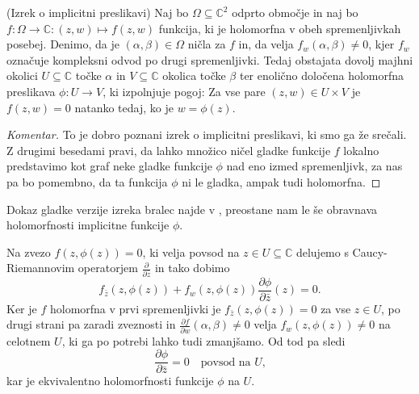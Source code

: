 \documentclass[mat1]{fmfdelo}
\newcommand{\C}{\mathbb C}
\newcommand{\pdv}[2][]{\frac{\partial#1}{\partial#2}}
\theoremstyle{definition}
\newenvironment{komentar}[1][Komentar]{\begin{proof}[#1]\let\qed\relax}{\end{proof}}
\begin{document}
\begin{izrek}(Izrek o implicitni preslikavi)
    \label{izrek o impliclitni preslikavi}
    Naj bo $\Omega \subseteq \C^2$ odprto območje in naj bo $f : \Omega \to \C : (z, w) \mapsto f(z,w)$ funkcija, ki je holomorfna v obeh spremenljivkah posebej. Denimo, da je $(\alpha, \beta) \in \Omega$ ničla za $f$ in, da velja $f_w(\alpha, \beta) \neq 0$, kjer $f_w$ označuje kompleksni odvod po drugi spremenljivki. Tedaj obstajata dovolj majhni okolici $U \subseteq \C$ točke $\alpha$ in $V \subseteq \C$ okolica točke $\beta$ ter enolično določena holomorfna preslikava $\phi : U \to V$, ki izpolnjuje pogoj: 
    Za vse pare $(z, w) \in U \times V$ je $f(z,w) = 0$ natanko tedaj, ko je $w = \phi(z)$.
    
    

\end{izrek}

\begin{komentar}
    To je dobro poznani izrek o implicitni preslikavi, ki smo ga že srečali. Z drugimi besedami pravi, da lahko množico ničel gladke funkcije $f$ lokalno predstavimo kot graf neke gladke funkcije $\phi$ nad eno izmed spremenljivk, za nas pa bo pomembno, da ta funkcija $\phi$ ni le gladka, ampak tudi holomorfna. 
\end{komentar}

\begin{dokaz}
    Dokaz gladke verzije izreka bralec najde v \cite[Izrek 14]{Globevnik}, preostane nam le še obravnava holomorfnosti implicitne funkcije $\phi$.

    Na zvezo $f(z, \phi(z)) = 0$, ki velja povsod na $z \in U \subseteq \C$ delujemo s Caucy-Riemannovim operatorjem $\pdv{\bar{z}}$ in tako dobimo
    \[
        f_{\bar{z}}(z, \phi(z)) + f_{w}(z, \phi(z)) \pdv[\phi]{\bar{z}}(z) = 0.  
    \] 
    Ker je $f$ holomorfna v prvi spremenljivki je $f_{\bar{z}}(z, \phi(z)) = 0$ za vse $z \in U$, po drugi strani pa zaradi zveznosti in $\pdv[f]{w}(\alpha, \beta) \neq 0$ velja $f_{w}(z, \phi(z)) \neq 0$ na celotnem $U$, ki ga po potrebi lahko tudi zmanjšamo. Od tod pa sledi
    \[
        \pdv[\phi]{\bar{z}} = 0 \quad \text {povsod na $U$,}  
    \]
    kar je ekvivalentno holomorfnosti funkcije $\phi$ na $U$. 
\end{dokaz}
\end{document}
